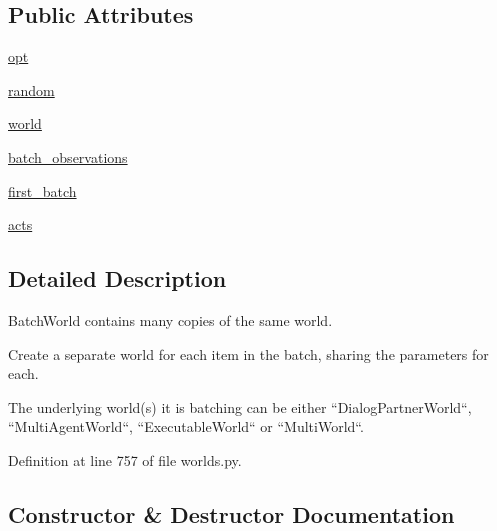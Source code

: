 \subsection*{Public Attributes}
\begin{DoxyCompactItemize}
\item 
\hyperlink{classparlai_1_1core_1_1worlds_1_1BatchWorld_a75c0ed09cce56774c61c9f59b543ed88}{opt}
\item 
\hyperlink{classparlai_1_1core_1_1worlds_1_1BatchWorld_a27b70249faa0bbe4bdff806a3f31ec13}{random}
\item 
\hyperlink{classparlai_1_1core_1_1worlds_1_1BatchWorld_ad7d651ac0fb1ee9b52ba7f134602e98e}{world}
\item 
\hyperlink{classparlai_1_1core_1_1worlds_1_1BatchWorld_a6f13286dedb14f257e043339b543cdeb}{batch\+\_\+observations}
\item 
\hyperlink{classparlai_1_1core_1_1worlds_1_1BatchWorld_a7cae7f1a21fbe52133bf9e75a4a3b673}{first\+\_\+batch}
\item 
\hyperlink{classparlai_1_1core_1_1worlds_1_1BatchWorld_a89bd00f625520bf66dda7d113cf0b40e}{acts}
\end{DoxyCompactItemize}


\subsection{Detailed Description}
\begin{DoxyVerb}BatchWorld contains many copies of the same world.

Create a separate world for each item in the batch, sharing
the parameters for each.

The underlying world(s) it is batching can be either
``DialogPartnerWorld``, ``MultiAgentWorld``, ``ExecutableWorld`` or
``MultiWorld``.
\end{DoxyVerb}
 

Definition at line 757 of file worlds.\+py.



\subsection{Constructor \& Destructor Documentation}
\mbox{\label{classparlai_1_1core_1_1worlds_1_1BatchWorld_a5235cdc5489274463245e6033fdf085b}} 
